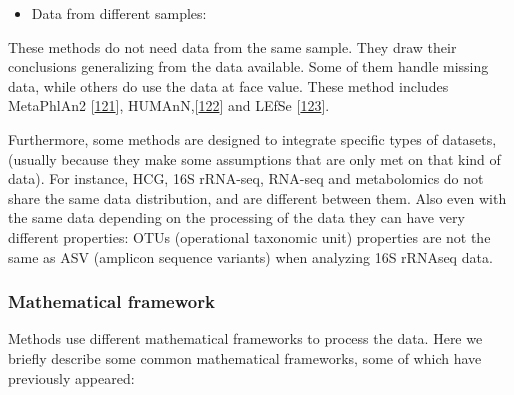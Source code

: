 \documentclass[
  12pt,
  a4paper,
  twoside,
  openright]{book}
\providecommand{\tightlist}{%
  \setlength{\itemsep}{0pt}\setlength{\parskip}{0pt}}
\begin{document}
\begin{itemize}
\tightlist
\item
  Data from different samples:
\end{itemize}

These methods do not need data from the same sample.
They draw their conclusions generalizing from the data available.
Some of them handle missing data, while others do use the data at face value.
These method includes MetaPhlAn2 {[}\protect\hyperlink{ref-franzosaSpecieslevelFunctionalProfiling2018}{121}{]}, HUMAnN,{[}\protect\hyperlink{ref-truongMetaPhlAn2EnhancedMetagenomic2015}{122}{]} and LEfSe {[}\protect\hyperlink{ref-segataMetagenomicBiomarkerDiscovery2011}{123}{]}.

Furthermore, some methods are designed to integrate specific types of datasets, (usually because they make some assumptions that are only met on that kind of data).
For instance, HCG, 16S rRNA-seq, RNA-seq and metabolomics do not share the same data distribution, and are different between them.
Also even with the same data depending on the processing of the data they can have very different properties: OTUs (operational taxonomic unit) properties are not the same as ASV (amplicon sequence variants) when analyzing 16S rRNAseq data.

\hypertarget{mathematical-framework}{%
\subsubsection{Mathematical framework}\label{mathematical-framework}}

Methods use different mathematical frameworks to process the data.
Here we briefly describe some common mathematical frameworks, some of which have previously appeared:
\end{document}
